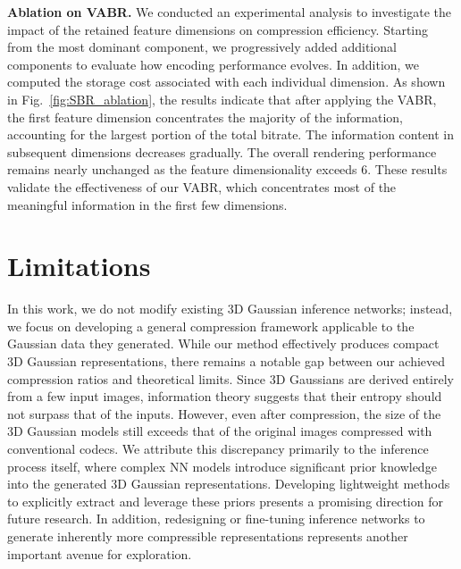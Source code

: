 \documentclass[lettersize,journal]{IEEEtran}
\begin{document}


\textbf{Ablation on VABR.} 
We conducted an experimental analysis to investigate the impact of the retained feature dimensions on compression efficiency. Starting from the most dominant component, we progressively added additional components to evaluate how encoding performance evolves.
In addition, we computed the storage cost associated with each individual dimension. As shown in Fig.~\ref{fig:SBR_ablation}, the results indicate that after applying the VABR, the first feature dimension concentrates the majority of the information, accounting for the largest portion of the total bitrate. The information content in subsequent dimensions decreases gradually. The overall rendering performance remains nearly unchanged as the feature dimensionality exceeds 6. These results validate the effectiveness of our VABR, which concentrates most of the meaningful information in the first few dimensions.



\section{Limitations}
\label{sec:limitations}
In this work, we do not modify existing 3D Gaussian inference networks; instead, we focus on developing a general compression framework applicable to the Gaussian data they generated. While our method effectively produces compact 3D Gaussian representations, there remains a notable gap between our achieved compression ratios and theoretical limits. Since 3D Gaussians are derived entirely from a few input images, information theory suggests that their entropy should not surpass that of the inputs. However, even after compression, the size of the 3D Gaussian models still exceeds that of the original images compressed with conventional codecs.
We attribute this discrepancy primarily to the inference process itself, where complex NN models introduce significant prior knowledge into the generated 3D Gaussian representations. Developing lightweight methods to explicitly extract and leverage these priors presents a promising direction for future research. In addition, redesigning or fine-tuning inference networks to generate inherently more compressible representations represents another important avenue for exploration.
\end{document}
